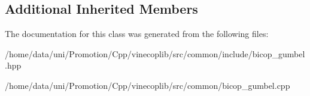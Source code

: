 \subsection*{Additional Inherited Members}


The documentation for this class was generated from the following files\+:\begin{DoxyCompactItemize}
\item 
/home/data/uni/\+Promotion/\+Cpp/vinecoplib/src/common/include/bicop\+\_\+gumbel.\+hpp\item 
/home/data/uni/\+Promotion/\+Cpp/vinecoplib/src/common/bicop\+\_\+gumbel.\+cpp\end{DoxyCompactItemize}
